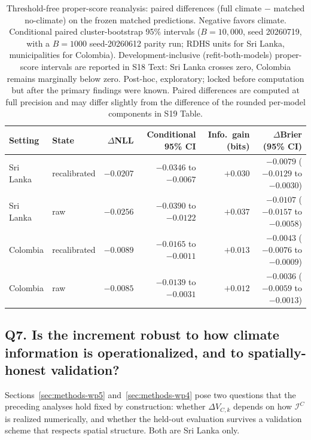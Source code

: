 \documentclass[11pt,a4paper]{article}
\begin{document}
\begin{table}[htbp]
\centering
\caption{Threshold-free proper-score reanalysis: paired differences (full climate $-$ matched no-climate) on the frozen matched predictions. Negative favors climate. Conditional paired cluster-bootstrap 95\% intervals ($B=10{,}000$, seed 20260719, with a $B=1000$ seed-20260612 parity run; RDHS units for Sri Lanka, municipalities for Colombia). Development-inclusive (refit-both-models) proper-score intervals are reported in S18 Text: Sri Lanka crosses zero, Colombia remains marginally below zero. Post-hoc, exploratory; locked before computation but after the primary findings were known. Paired differences are computed at full precision and may differ slightly from the difference of the rounded per-model components in S19 Table.}
\label{tab:properscore}
\footnotesize{}
\begin{tabularx}{\textwidth}{@{}llrrrr@{}}
\toprule
Setting & State & $\Delta$NLL & Conditional 95\% CI & Info.\ gain (bits) & $\Delta$Brier (95\% CI) \\
\midrule
Sri Lanka & recalibrated & $-0.0207$ & $-0.0346$ to $-0.0067$ & $+0.030$ & $-0.0079$ ($-0.0129$ to $-0.0030$) \\
Sri Lanka & raw & $-0.0256$ & $-0.0390$ to $-0.0122$ & $+0.037$ & $-0.0107$ ($-0.0157$ to $-0.0058$) \\
Colombia & recalibrated & $-0.0089$ & $-0.0165$ to $-0.0011$ & $+0.013$ & $-0.0043$ ($-0.0076$ to $-0.0009$) \\
Colombia & raw & $-0.0085$ & $-0.0139$ to $-0.0031$ & $+0.012$ & $-0.0036$ ($-0.0059$ to $-0.0013$) \\
\bottomrule
\end{tabularx}
\end{table}


\subsection{Q7. Is the increment robust to how climate information is operationalized, and to spatially-honest validation?}\label{sec:wp45}
Sections~\ref{sec:methods-wp5} and~\ref{sec:methods-wp4} pose two questions that the preceding analyses hold fixed by construction: whether $\Delta V_{C,k}$ depends on how $\mathcal I^{C}$ is realized numerically, and whether the held-out evaluation survives a validation scheme that respects spatial structure. Both are Sri Lanka only.
\end{document}
